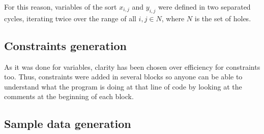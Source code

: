 For this reason, variables of the sort $x_{i,j}$ and $y_{i,j}$ were defined in
two separated cycles, iterating twice over the range of all $i,j\in{N}$, where
$N$ is the set of holes.

\subsection{Constraints generation}
As it was done for variables, clarity has been chosen over efficiency for
constraints too. Thus, constraints were added in several blocks so anyone can
be able to understand what the program is doing at that line of code by looking
at the comments at the beginning of each block.

\subsection{Sample data generation}
